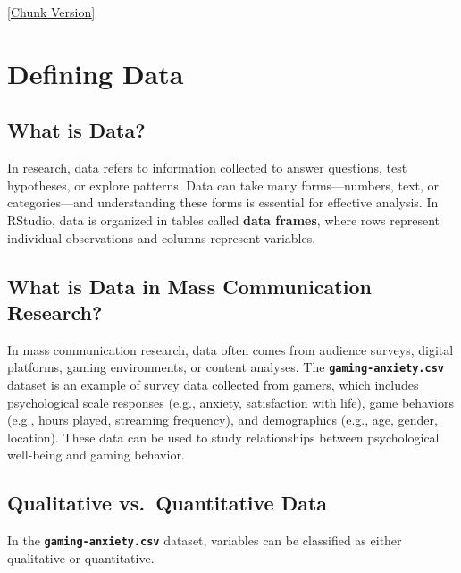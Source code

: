 \documentclass[
]{book}
\begin{document}
\href{_book/files/09-data_management-chunks.Rmd}{{[}Chunk Version{]}}

\section{Defining Data}\label{defining-data}

\subsection*{What is Data?}\label{what-is-data}

In research, data refers to information collected to answer questions, test hypotheses, or explore patterns. Data can take many forms---numbers, text, or categories---and understanding these forms is essential for effective analysis. In RStudio, data is organized in tables called \textbf{data frames}, where rows represent individual observations and columns represent variables.

\subsection*{What is Data in Mass Communication Research?}\label{what-is-data-in-mass-communication-research}

In mass communication research, data often comes from audience surveys, digital platforms, gaming environments, or content analyses. The \textbf{\texttt{gaming-anxiety.csv}} dataset is an example of survey data collected from gamers, which includes psychological scale responses (e.g., anxiety, satisfaction with life), game behaviors (e.g., hours played, streaming frequency), and demographics (e.g., age, gender, location). These data can be used to study relationships between psychological well-being and gaming behavior.

\subsection*{Qualitative vs.~Quantitative Data}\label{qualitative-vs.-quantitative-data}

In the \textbf{\texttt{gaming-anxiety.csv}} dataset, variables can be classified as either qualitative or quantitative.
\end{document}
